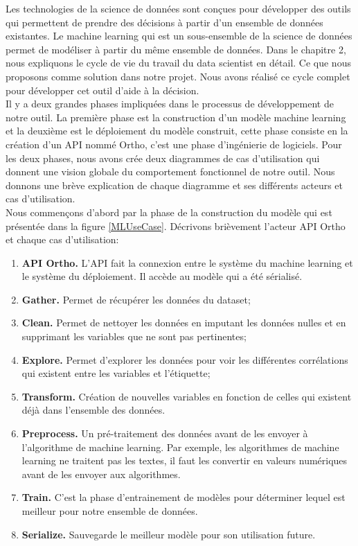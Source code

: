 \documentclass[12pt, french]{report}
\begin{document}
Les technologies de la science de données sont conçues pour développer des outils qui permettent de prendre des décisions à partir d'un ensemble de données existantes. Le machine learning qui est un sous-ensemble de la science de données permet de modéliser à partir du même ensemble de données. Dans le chapitre 2, nous expliquons le cycle de vie du travail du data scientist en détail. Ce que nous proposons comme solution dans notre projet. Nous avons réalisé ce cycle complet pour développer cet outil d'aide à la décision. \\

Il y a deux grandes phases impliquées dans le processus de développement de notre outil. La première phase est la construction d'un modèle machine learning et la deuxième est le déploiement du modèle construit, cette phase consiste en la création d'un API nommé Ortho, c'est une phase d'ingénierie de logiciels. Pour les deux phases, nous avons crée deux diagrammes de cas d'utilisation qui donnent une vision globale du comportement fonctionnel de notre outil. Nous donnons une brève explication de chaque diagramme et ses différents acteurs et cas d'utilisation. \\

Nous commençons d'abord par la phase de la construction du modèle qui est présentée dans la figure \ref{MLUseCase}.  Décrivons brièvement l'acteur API Ortho et chaque cas d'utilisation:
\begin{enumerate}
\item \textbf{API Ortho.} L'API fait la connexion entre le système du machine learning et le système du déploiement. Il accède au modèle qui a été sérialisé. 
\item \textbf{Gather.} Permet de récupérer les données du dataset;
\item \textbf{Clean.} Permet de nettoyer les données en imputant les données nulles et en supprimant les variables que ne sont pas pertinentes;
\item \textbf{Explore.} Permet d'explorer les données pour voir les différentes corrélations qui existent entre les variables et l'étiquette;
\item \textbf{Transform.} Création de nouvelles variables en fonction de celles qui existent déjà dans l'ensemble des données. 
\item \textbf{Preprocess.} Un pré-traitement des données avant de les envoyer à l'algorithme de machine learning. Par exemple, les algorithmes de machine learning ne traitent pas les textes, il faut les convertir en valeurs numériques avant de les envoyer aux algorithmes. 
\item \textbf{Train.} C'est la phase d'entrainement de modèles pour déterminer lequel est meilleur pour notre ensemble de données.
\item \textbf{Serialize.} Sauvegarde le meilleur modèle pour son utilisation future. 
\end{enumerate}
\end{document}
